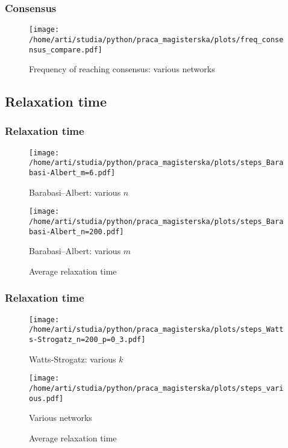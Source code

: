\documentclass[a4paper, 11pt]{beamer}
\begin{document}
\begin{frame}
\frametitle{Consensus}
\begin{figure}[H]
		\centering
		\texttt{[image: /home/arti/studia/python/praca\_magisterska/plots/freq\_consensus\_compare.pdf]}
		\caption{Frequency of reaching consensus: various networks}
\end{figure}
\end{frame}


\subsection{Relaxation time}

\begin{frame}
\frametitle{Relaxation time}
	\begin{figure}[ht]
		\begin{minipage}[b]{0.45\linewidth}
            \centering
            \texttt{[image: /home/arti/studia/python/praca\_magisterska/plots/steps\_Barabasi-Albert\_m=6.pdf]}
            \caption{Barabasi--Albert: various $n$}
        \end{minipage}
        \hspace{0.5cm}
        \begin{minipage}[b]{0.45\linewidth}
            \centering
            \texttt{[image: /home/arti/studia/python/praca\_magisterska/plots/steps\_Barabasi-Albert\_n=200.pdf]}
            \caption{Barabasi--Albert: various $m$}
        \end{minipage}
    \caption{Average relaxation time}
    \end{figure}
\end{frame}


\begin{frame}
\frametitle{Relaxation time}
	\begin{figure}[ht]
		\begin{minipage}[b]{0.45\linewidth}
            \centering
            \texttt{[image: /home/arti/studia/python/praca\_magisterska/plots/steps\_Watts-Strogatz\_n=200\_p=0\_3.pdf]}
            \caption{Watts-Strogatz: various $k$}
        \end{minipage}
        \hspace{0.5cm}
        \begin{minipage}[b]{0.45\linewidth}
            \centering
            \texttt{[image: /home/arti/studia/python/praca\_magisterska/plots/steps\_various.pdf]}
            \caption{Various networks}
        \end{minipage}
    \caption{Average relaxation time}
    \end{figure}
\end{frame}
\end{document}
